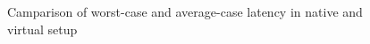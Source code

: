 \begin{figure}[!htb]
\begin{center}
\begin{tikzpicture}
\end{tikzpicture}
\end{center}
\caption{Camparison of worst-case and average-case latency in native and virtual setup}
\label{plot-native-vs-virtual}
\end{figure}
